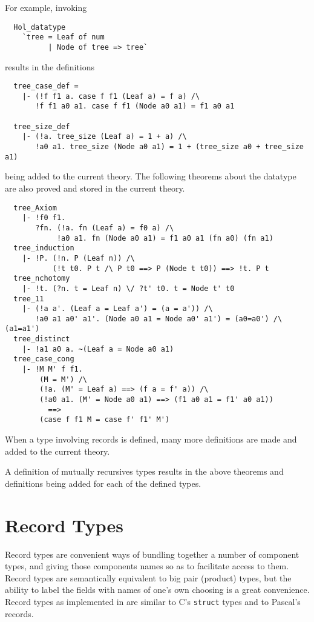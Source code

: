 For example, invoking
%
\begin{hol}
\begin{verbatim}
  Hol_datatype
    `tree = Leaf of num
          | Node of tree => tree`
\end{verbatim}
\end{hol}
%
results in the definitions
%
\begin{hol}
\begin{verbatim}
  tree_case_def =
    |- (!f f1 a. case f f1 (Leaf a) = f a) /\
       !f f1 a0 a1. case f f1 (Node a0 a1) = f1 a0 a1

  tree_size_def
    |- (!a. tree_size (Leaf a) = 1 + a) /\
       !a0 a1. tree_size (Node a0 a1) = 1 + (tree_size a0 + tree_size a1)
\end{verbatim}
\end{hol}
%
being added to the current theory. The following theorems about the datatype
are also proved and stored in the current theory.
%
\begin{hol}
\begin{verbatim}
  tree_Axiom
    |- !f0 f1.
       ?fn. (!a. fn (Leaf a) = f0 a) /\
            !a0 a1. fn (Node a0 a1) = f1 a0 a1 (fn a0) (fn a1)
  tree_induction
    |- !P. (!n. P (Leaf n)) /\
           (!t t0. P t /\ P t0 ==> P (Node t t0)) ==> !t. P t
  tree_nchotomy
    |- !t. (?n. t = Leaf n) \/ ?t' t0. t = Node t' t0
  tree_11
    |- (!a a'. (Leaf a = Leaf a') = (a = a')) /\
       !a0 a1 a0' a1'. (Node a0 a1 = Node a0' a1') = (a0=a0') /\ (a1=a1')
  tree_distinct
    |- !a1 a0 a. ~(Leaf a = Node a0 a1)
  tree_case_cong
    |- !M M' f f1.
        (M = M') /\
        (!a. (M' = Leaf a) ==> (f a = f' a)) /\
        (!a0 a1. (M' = Node a0 a1) ==> (f1 a0 a1 = f1' a0 a1))
          ==>
        (case f f1 M = case f' f1' M')
\end{verbatim}
\end{hol}
%
When a type involving records is defined, many more definitions are
made and added to the current theory.

A definition of mutually recursives types results in the above theorems and
definitions being added for each of the defined types.

\section{Record Types}

Record types are convenient ways of bundling together a number of
component types, and giving those components names so as to facilitate
access to them.  Record types are semantically equivalent to big pair
(product) types, but the ability to label the fields with names of
one's own choosing is a great convenience.  Record types as
implemented in \HOL{} are similar to C's \texttt{struct} types and to
Pascal's records.

